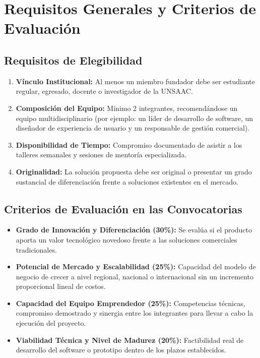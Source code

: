﻿\documentclass[12pt,a4paper]{article}
\begin{document}
\section{Requisitos Generales y Criterios de Evaluación}

\subsection{Requisitos de Elegibilidad}
\begin{enumerate}[leftmargin=*]
    \item \textbf{Vínculo Institucional:} Al menos un miembro fundador debe ser estudiante regular, egresado, docente o investigador de la UNSAAC.
    \item \textbf{Composición del Equipo:} Mínimo 2 integrantes, recomendándose un equipo multidisciplinario (por ejemplo: un líder de desarrollo de software, un diseñador de experiencia de usuario y un responsable de gestión comercial).
    \item \textbf{Disponibilidad de Tiempo:} Compromiso documentado de asistir a los talleres semanales y sesiones de mentoría especializada.
    \item \textbf{Originalidad:} La solución propuesta debe ser original o presentar un grado sustancial de diferenciación frente a soluciones existentes en el mercado.
\end{enumerate}

\subsection{Criterios de Evaluación en las Convocatorias}
\begin{itemize}[leftmargin=*]
    \item \textbf{Grado de Innovación y Diferenciación (30\%):} Se evalúa si el producto aporta un valor tecnológico novedoso frente a las soluciones comerciales tradicionales.
    \item \textbf{Potencial de Mercado y Escalabilidad (25\%):} Capacidad del modelo de negocio de crecer a nivel regional, nacional o internacional sin un incremento proporcional lineal de costos.
    \item \textbf{Capacidad del Equipo Emprendedor (25\%):} Competencias técnicas, compromiso demostrado y sinergia entre los integrantes para llevar a cabo la ejecución del proyecto.
    \item \textbf{Viabilidad Técnica y Nivel de Madurez (20\%):} Factibilidad real de desarrollo del software o prototipo dentro de los plazos establecidos.
\end{itemize}
\end{document}
